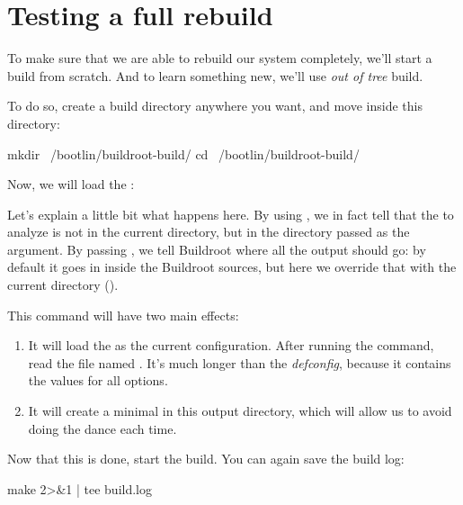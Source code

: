 \section{Testing a full rebuild}

To make sure that we are able to rebuild our system completely, we'll
start a build from scratch. And to learn something new, we'll use {\em
  out of tree} build.

To do so, create a build directory anywhere you want, and move inside
this directory:

\begin{bashinput}
mkdir ~/bootlin/buildroot-build/
cd ~/bootlin/buildroot-build/
\end{bashinput}

Now, we will load the :


Let's explain a little bit what happens here. By using
, we in fact tell  that the
 to analyze is not in the current directory, but in the
directory passed as the  argument. By passing , we
tell Buildroot where all the output should go: by default it goes in
 inside the Buildroot sources, but here we override that
with the current directory ().

This command will have two main effects:

\begin{enumerate}

\item It will load the  as the current
  configuration. After running the command, read the file named
  . It's much longer than the {\em defconfig}, because
  it contains the values for all options.

\item It will create a minimal  in this output
  directory, which will allow us to avoid doing the  dance each time.

\end{enumerate}

Now that this is done, start the build. You can again save the build
log:

\begin{bashinput}
make 2>&1 | tee build.log
\end{bashinput}
